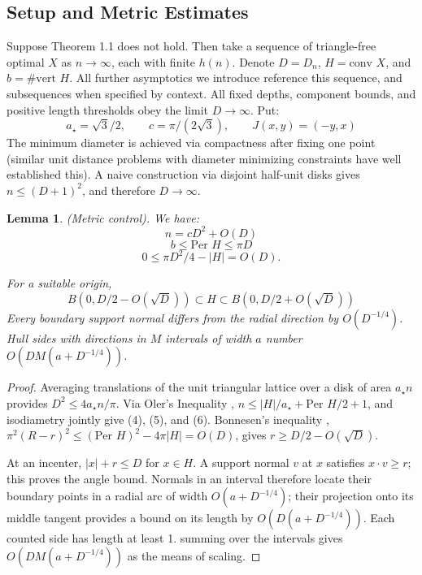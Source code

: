 \documentclass[10pt,reqno]{amsart}
\newtheorem{lemma}{Lemma}[section]
\begin{document}
\subsection{Setup and Metric Estimates}


Suppose Theorem 1.1 does not hold. Then take a sequence of triangle-free optimal $X$ as $n \to \infty$, each with finite $h(n)$. Denote $D = D_n$, $H = \text{conv } X$, and $b = \# \text{vert } H$. All further asymptotics we introduce reference this sequence, and subsequences when specified by context. All fixed depths, component bounds, and positive length thresholds obey the limit $D \to \infty$. Put:
\begin{equation}
    a_\star = \sqrt{3}/2, \qquad c = \pi / (2\sqrt{3}), \qquad J(x, y) = (-y, x)
\end{equation}
The minimum diameter is achieved via compactness after fixing one point (similar unit distance problems with diameter minimizing constraints have well established this). A naive construction via disjoint half-unit disks gives $n \le (D + 1)^2$, and therefore $D \to \infty$.
\begin{lemma}
    (Metric control). We have:
    \begin{equation}n = cD^2 + O(D)
    \end{equation}
    \begin{equation}b \le \text{Per } H \le \pi D
    \end{equation}
    \begin{equation}0 \le \pi D^2 / 4 - |H| = O(D).
    \end{equation}
    
    For a suitable origin,
    \begin{equation}
        B(0, D / 2 - O(\sqrt{D})) \subset H \subset B(0, D/2 + O(\sqrt{D}))
    \end{equation}
    Every boundary support normal differs from the radial direction by $O(D^{-1/4})$. Hull sides with directions in $M$ intervals of width $a$ number $O(DM(a + D^{-1/4}))$. 
\end{lemma}
\begin{proof}
    Averaging translations of the unit triangular lattice over a disk of area $a_\star n$ provides $D^2 \le 4 a_\star n / \pi$. Via Oler's Inequality \cite{2}, $n \le |H| / a_\star + \text{Per } H / 2 + 1$, and isodiametry jointly give (4), (5), and (6). Bonnesen's inequality \cite{3,4}, $\pi^2 (R - r)^2 \le (\text{Per }H)^2 - 4 \pi |H| = O(D)$, gives $r \ge D / 2 - O(\sqrt{D})$.

    At an incenter, $|x| + r \le D$ for $x \in H$. A support normal $v$ at $x$ satisfies $x \cdot v \ge r$; this proves the angle bound. Normals in an interval therefore locate their boundary points in a radial arc of width $O(a + D^{-1/4})$; their projection onto its middle tangent provides a bound on its length by $O(D(a + D^{-1/4}))$. Each counted side has length at least 1. summing over the intervals gives $O(DM (a + D^{-1/4}))$ as the means of scaling.
\end{proof}
\end{document}
